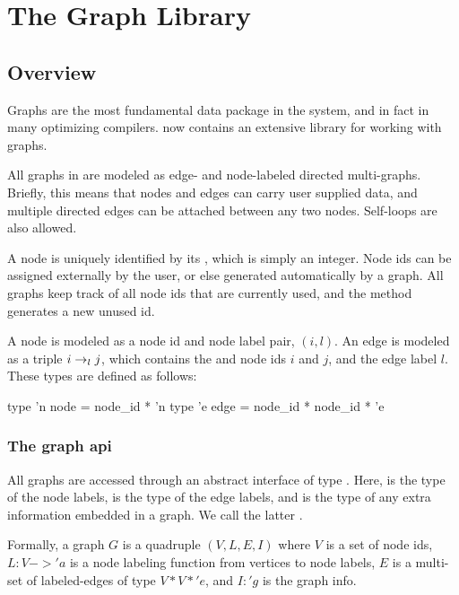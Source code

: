 \section{The Graph Library}

\subsection{Overview}

Graphs are the most fundamental data package in the \MLRISC{} system,
and in fact in many optimizing compilers.
\MLRISC{} now contains an extensive library for working with graphs.

All graphs in \MLRISC{} 
are modeled as edge- and node-labeled directed multi-graphs.
Briefly, this means that nodes and edges can carry user supplied data, and  
multiple directed edges can be attached between any two nodes.
Self-loops are also allowed.

A node is uniquely identified by its , which is
simply an integer.  Node ids can be assigned externally 
by the user, or else generated automatically by a graph.  All graphs
keep track of all node ids that are currently used,
and the method  generates a new unused id.

A node is modeled as a node id and node label pair, $(i,l)$.
An edge is modeled as a triple $i \rightarrow_{l} j$, which contains
the  and  node ids $i$ and $j$,
and the edge label $l$.  These types are defined as follows:
\begin{SML}
   type 'n node = node_id * 'n 
   type 'e edge = node_id * node_id * 'e
\end{SML}

\subsubsection{The graph api}

All graphs are accessed through an abstract interface
of type .
Here,  is the type of the node labels,  is the type
of the edge labels, and  is the type of any extra information
embedded in a graph.  We call the latter .

Formally, a graph $G$ is a quadruple $(V,L,E,I)$
where $V$ is a set of node ids, $L : V -> 'a$ is a node labeling
function from vertices to node labels, $E$ is a multi-set
of labeled-edges of type $V * V * 'e$, and $I: 'g$
is the graph info.

